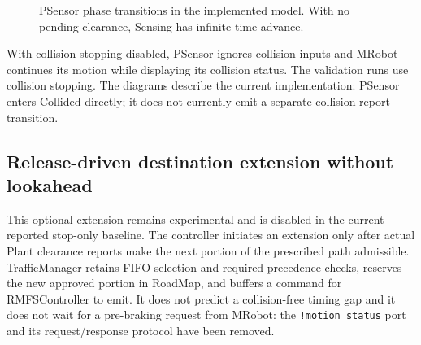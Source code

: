 \documentclass[11pt,a4paper]{article}
\theoremstyle{remark}
\begin{document}
\begin{figure}[htbp]
\centering
{}
\caption{PSensor phase transitions in the implemented model. With no
pending clearance, Sensing has infinite time advance.}
\label{fig:psensor-phases}
\end{figure}
With collision stopping disabled, PSensor ignores collision inputs and
MRobot continues its motion while displaying its collision status. The
validation runs use collision stopping. The diagrams describe the current
implementation: PSensor enters Collided directly; it does not currently
emit a separate collision-report transition.

\clearpage
\subsection{Release-driven destination extension without lookahead}
This optional extension remains experimental and is disabled in the current
reported stop-only baseline. The controller initiates an extension only after actual Plant clearance
reports make the next portion of the prescribed path admissible. TrafficManager
retains FIFO selection and required precedence checks, reserves the new approved
portion in RoadMap, and buffers a command for RMFSController to emit.
It does not predict a collision-free timing gap and it does not wait for a
pre-braking request from MRobot: the \texttt{!motion\_status} port and its
request/response protocol have been removed.
\end{document}
